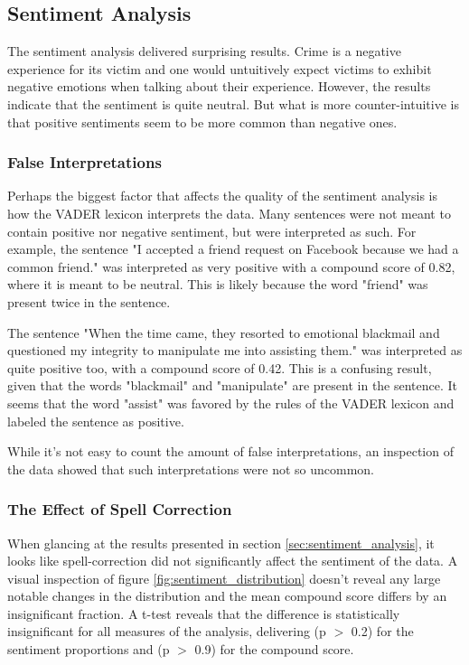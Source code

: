 \subsection{Sentiment Analysis}

The sentiment analysis delivered surprising results. Crime is a negative experience for its victim and one would untuitively expect victims to exhibit negative emotions when talking about their experience. However, the results indicate that the sentiment is quite neutral. But what is more counter-intuitive is that positive sentiments seem to be more common than negative ones.

\subsubsection*{False Interpretations}

Perhaps the biggest factor that affects the quality of the sentiment analysis is how the VADER lexicon interprets the data. Many sentences were not meant to contain positive nor negative sentiment, but were interpreted as such. For example, the sentence "I accepted a friend request on Facebook because we had a common friend." was interpreted as very positive with a compound score of 0.82, where it is meant to be neutral. This is likely because the word "friend" was present twice in the sentence.

The sentence "When the time came, they resorted to emotional blackmail and questioned my integrity to manipulate me into assisting them." was interpreted as quite positive too, with a compound score of 0.42. This is a confusing result, given that the words "blackmail" and "manipulate" are present in the sentence. It seems that the word "assist" was favored by the rules of the VADER lexicon and labeled the sentence as positive.

While it's not easy to count the amount of false interpretations, an inspection of the data showed that such interpretations were not so uncommon. 

\subsubsection*{The Effect of Spell Correction}

When glancing at the results presented in section \ref{sec:sentiment_analysis}, it looks like spell-correction did not significantly affect the sentiment of the data. A visual inspection of figure \ref{fig:sentiment_distribution} doesn't reveal any large notable changes in the distribution and the mean compound score differs by an insignificant fraction. A t-test reveals that the difference is statistically insignificant for all measures of the analysis, delivering (p $>$ 0.2) for the sentiment proportions and (p $>$ 0.9) for the compound score.

